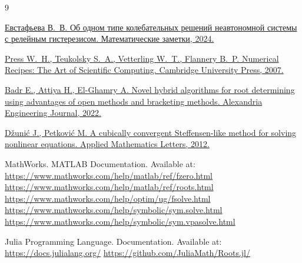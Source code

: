 \documentclass[12pt,a4paper]{article}
\theoremstyle{bigplain}
\theoremstyle{plain}
\begin{document}
\begin{thebibliography}{9}

\href{https://www.mathnet.ru/php/archive.phtml?wshow=paper&jrnid=mzm&paperid=14020&option_lang=rus}{
Евстафьева В.~В.
Об одном типе колебательных решений неавтономной системы
с релейным гистерезисом.
Математические заметки, 2024.}



\href{https://faculty.kfupm.edu.sa/phys/aanaqvi/Numerical%20Recipes-The%20Art%20of%20Scientific%20Computing%203rd%20Edition%20(Press%20et%20al).pdf}{
Press W.~H., Teukolsky S.~A., Vetterling W.~T., Flannery B.~P.
Numerical Recipes: The Art of Scientific Computing.
Cambridge University Press, 2007.}

\href{https://www.researchgate.net/publication/360883886_Novel_hybrid_algorithms_for_root_determining_using_advantages_of_open_methods_and_bracketing_methods}{
Badr E., Attiya H., El-Ghamry A.
Novel hybrid algorithms for root determining using advantages of open methods and bracketing methods.
Alexandria Engineering Journal, 2022.}



\href{https://www.sciencedirect.com/science/article/pii/S0893965912001395}{
Džunić J., Petković M.
A cubically convergent Steffensen-like method for solving nonlinear equations.
Applied Mathematics Letters, 2012.}

MathWorks.
MATLAB Documentation.
Available at:
\url{https://www.mathworks.com/help/matlab/ref/fzero.html}
\url{https://www.mathworks.com/help/matlab/ref/roots.html}
\url{https://www.mathworks.com/help/optim/ug/fsolve.html}
\url{https://www.mathworks.com/help/symbolic/sym.solve.html}
\url{https://www.mathworks.com/help/symbolic/sym.vpasolve.html}
    

Julia Programming Language.
Documentation.
Available at:
\url{https://docs.julialang.org/}
\url{https://github.com/JuliaMath/Roots.jl/}


\end{thebibliography}
\end{document}
